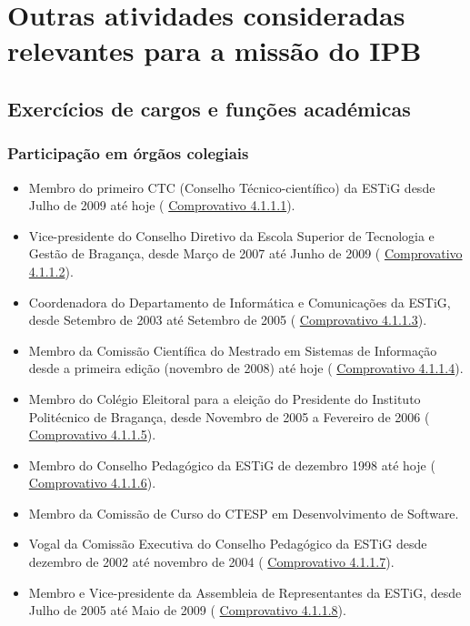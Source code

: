 \documentclass[11pt]{article}
\begin{document}
\section{Outras atividades consideradas relevantes para a missão do IPB}
\subsection{Exercícios de cargos e funções académicas}
\subsubsection{Participação em órgãos colegiais}
\begin{itemize}
\item{Membro do primeiro CTC (Conselho Técnico-científico) da ESTiG desde Julho de 2009 até hoje (
\href{run:MissaoIPBCargos/ctc.pdf}{Comprovativo 4.1.1.1}). }
\item{Vice-presidente do Conselho Diretivo da Escola Superior de Tecnologia e Gestão de Bragança, desde Março de 2007 até Junho de 2009 (
\href{run:MissaoIPBCargos/subdiretora.pdf}{Comprovativo 4.1.1.2}).}
\item{Coordenadora do Departamento de Informática e Comunicações da ESTiG, desde Setembro de 2003 até Setembro de 2005 (
\href{run:MissaoIPBCargos/coordDIC.pdf}{Comprovativo 4.1.1.3}).}
\item{Membro da Comissão Científica do Mestrado em Sistemas de Informação desde a primeira edição (novembro de 2008) até hoje (
\href{run:MissaoIPBCargos/msi.pdf}{Comprovativo 4.1.1.4}).}
\item{Membro do Colégio Eleitoral para a eleição do Presidente do Instituto Politécnico de Bragança, desde Novembro de 2005 a Fevereiro de 2006 (
\href{run:MissaoIPBCargos/colegioeleitoral.pdf}{Comprovativo 4.1.1.5}).}
\item{Membro do Conselho Pedagógico da ESTiG de dezembro 1998 até hoje (
\href{run:MissaoIPBCargos/CP.pdf}{Comprovativo 4.1.1.6}).  }
\item{Membro da Comissão de Curso do CTESP em Desenvolvimento de Software.}
\item{Vogal da Comissão Executiva do Conselho Pedagógico da ESTiG desde dezembro de 2002 até novembro de 2004 (
\href{run:MissaoIPBCargos/CP.pdf}{Comprovativo 4.1.1.7}).}
\item{Membro e Vice-presidente da Assembleia de Representantes da ESTiG, desde Julho de 2005 até Maio de 2009 (
\href{run:MissaoIPBCargos/AssembleiaRepresentantes.pdf}{Comprovativo 4.1.1.8}).}

\end{itemize}
\end{document}
